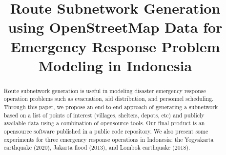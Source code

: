 \documentclass[conference]{IEEEtran}
\begin{document}
\title{Route Subnetwork Generation using OpenStreetMap Data for Emergency Response Problem Modeling in Indonesia}

\author{
\and
{}
}

\maketitle

\begin{abstract}
Route subnetwork generation is useful in modeling disaster emergency response operation problems such as evacuation, aid distribution, and personnel scheduling. Through this paper, we propose an end-to-end approach of generating a subnetwork based on a list of points of interest (villages, shelters, depots, etc) and publicly available data using a combination of opensource tools. Our  final product is an opensource software published in a public code repository. We also present some experiments for three emergency response operations in Indonesia: the Yogyakarta earthquake (2020), Jakarta flood (2013), and Lombok earthquake (2018).
\end{abstract}
\end{document}
